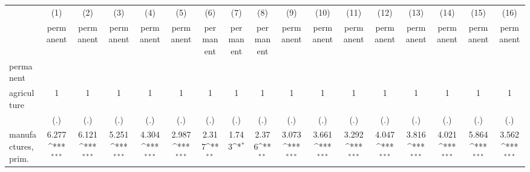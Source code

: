 {
\def\sym#1{\ifmmode^{#1}\else\(^{#1}\)\fi}
\begin{tabular}{l*{16}{c}}
\hline\hline
                    &\multicolumn{1}{c}{(1)}&\multicolumn{1}{c}{(2)}&\multicolumn{1}{c}{(3)}&\multicolumn{1}{c}{(4)}&\multicolumn{1}{c}{(5)}&\multicolumn{1}{c}{(6)}&\multicolumn{1}{c}{(7)}&\multicolumn{1}{c}{(8)}&\multicolumn{1}{c}{(9)}&\multicolumn{1}{c}{(10)}&\multicolumn{1}{c}{(11)}&\multicolumn{1}{c}{(12)}&\multicolumn{1}{c}{(13)}&\multicolumn{1}{c}{(14)}&\multicolumn{1}{c}{(15)}&\multicolumn{1}{c}{(16)}\\
                    &\multicolumn{1}{c}{permanent}&\multicolumn{1}{c}{permanent}&\multicolumn{1}{c}{permanent}&\multicolumn{1}{c}{permanent}&\multicolumn{1}{c}{permanent}&\multicolumn{1}{c}{permanent}&\multicolumn{1}{c}{permanent}&\multicolumn{1}{c}{permanent}&\multicolumn{1}{c}{permanent}&\multicolumn{1}{c}{permanent}&\multicolumn{1}{c}{permanent}&\multicolumn{1}{c}{permanent}&\multicolumn{1}{c}{permanent}&\multicolumn{1}{c}{permanent}&\multicolumn{1}{c}{permanent}&\multicolumn{1}{c}{permanent}\\
\hline
permanent           &                     &                     &                     &                     &                     &                     &                     &                     &                     &                     &                     &                     &                     &                     &                     &                     \\
agriculture         &           1         &           1         &           1         &           1         &           1         &           1         &           1         &           1         &           1         &           1         &           1         &           1         &           1         &           1         &           1         &           1         \\
                    &         (.)         &         (.)         &         (.)         &         (.)         &         (.)         &         (.)         &         (.)         &         (.)         &         (.)         &         (.)         &         (.)         &         (.)         &         (.)         &         (.)         &         (.)         &         (.)         \\
[1em]
manufactures, prim. &       6.277\sym{***}&       6.121\sym{***}&       5.251\sym{***}&       4.304\sym{***}&       2.987\sym{***}&       2.317\sym{**} &       1.743\sym{*}  &       2.376\sym{**} &       3.073\sym{***}&       3.661\sym{***}&       3.292\sym{***}&       4.047\sym{***}&       3.816\sym{***}&       4.021\sym{***}&       5.864\sym{***}&       3.562\sym{***}\\

\end{tabular}}
